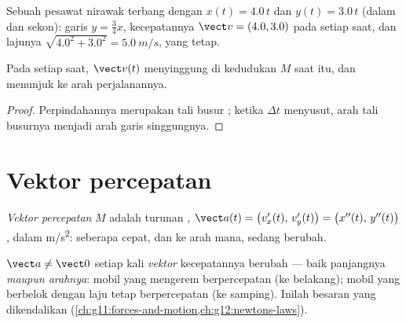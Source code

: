 \begin{example}\label{ex:g12:kinematics-2d:drone}
Sebuah pesawat nirawak terbang dengan $x(t) = 4.0\,t$ dan
$y(t) = 3.0\,t$ (dalam  dan sekon):  garis
$y = \tfrac34 x$, kecepatannya $\vect v = (4.0, 3.0)$ pada setiap saat,
dan lajunya $\sqrt{4.0^2 + 3.0^2} = \qty{5.0}{m/s}$, yang tetap.
\end{example}

\begin{proposition}\label{prop:g12:kinematics-2d:tangent}
Pada setiap saat, $\vect v(t)$ menyinggung  di kedudukan $M$
saat itu, dan menunjuk ke arah perjalanannya.
\end{proposition}

\begin{proof}
Perpindahannya merupakan tali busur ; ketika $\Delta t$
menyusut, arah tali busurnya menjadi arah garis singgungnya.
\end{proof}

\section{Vektor percepatan}

\begin{definition}\label{def:g12:kinematics-2d:acceleration}
\emph{Vektor percepatan} $M$ adalah turunan
,
$\vect a(t) = \bigl(v_x'(t),\, v_y'(t)\bigr) =
\bigl(x''(t),\, y''(t)\bigr)$, dalam \unit{m/s^2}: seberapa cepat, dan
ke arah mana,  sedang berubah.
\end{definition}

\begin{remark}\label{rem:g12:kinematics-2d:turning}
$\vect a \neq \vect 0$ setiap kali \emph{vektor} kecepatannya berubah
--- baik panjangnya \emph{maupun arahnya}: mobil yang mengerem
berpercepatan (ke belakang); mobil yang berbelok dengan laju tetap
berpercepatan (ke samping). Inilah besaran yang dikendalikan 
(\cref{ch:g11:forces-and-motion,ch:g12:newtons-laws}).
\end{remark}

